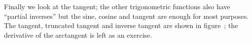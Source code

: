 
Finally we look at the tangent; the other trigonometric functions also
have ``partial inverses'' but the sine, cosine and tangent are enough
for most purposes. The tangent, truncated tangent and inverse tangent
are shown in figure~; the derivative of
the arctangent is left as an exercise.


